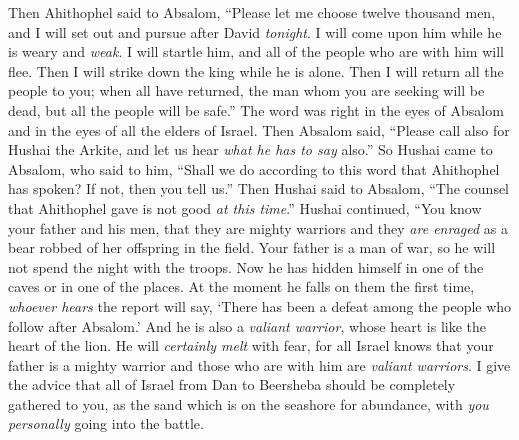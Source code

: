 \begin{biblechapter} %
 Then Ahithophel said to Absalom, “Please let me choose twelve thousand men, and I will set out and pursue after David \textit{tonight}.
\verse I will come upon him while he is weary and \textit{weak}. I will startle him, and all of the people who are with him will flee. Then I will strike down the king while he is alone.
\verse Then I will return all the people to you; when all have returned, the man whom you are seeking will be dead, but all the people will be safe.”
\verse The word was right in the eyes of Absalom and in the eyes of all the elders of Israel.
\verse Then Absalom said, “Please call also for Hushai the Arkite, and let us hear \textit{what he has to say} also.”
\verse So Hushai came to Absalom, who said to him, “Shall we do according to this word that Ahithophel has spoken? If not, then you tell us.”
\verse Then Hushai said to Absalom, “The counsel that Ahithophel gave is not good \textit{at this time}.”
\verse Hushai continued, “You know your father and his men, that they are mighty warriors and they \textit{are enraged} as a bear robbed of her offspring in the field. Your father is a man of war, so he will not spend the night with the troops.
\verse Now he has hidden himself in one of the caves or in one of the places. At the moment he falls on them the first time, \textit{whoever hears} the report will say, ‘There has been a defeat among the people who follow after Absalom.’
\verse And he is also a \textit{valiant warrior}, whose heart is like the heart of the lion. He will \textit{certainly melt} with fear, for all Israel knows that your father is a mighty warrior and those who are with him are \textit{valiant warriors}.
\verse I give the advice that all of Israel from Dan to Beersheba should be completely gathered to you, as the sand which is on the seashore for abundance, with \textit{you personally} going into the battle.

\end{biblechapter}
